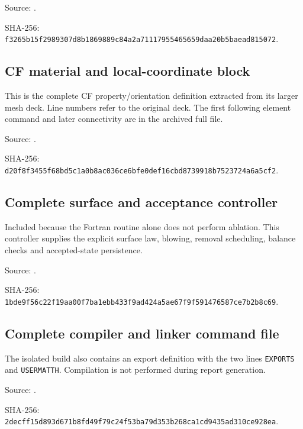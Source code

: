 \documentclass[oneside,openany]{amsdtx}
\begin{document}
{\footnotesize\noindent Source: .\par\noindent SHA-256: \texttt{f3265b15f2989307d8b1869889c84a2a71117955465659daa20b5baead815072}.\par}


\clearpage\subsection{CF material and local-coordinate block}
This is the complete CF property/orientation definition extracted from its larger mesh deck. Line numbers refer to the original deck. The first following element command and later connectivity are in the archived full file.

{\footnotesize\noindent Source: .\par\noindent SHA-256: \texttt{d20f8f3455f68bd5c1a0b8ac036ce6bfe0def16cbd8739918b7523724a6a5cf2}.\par}


\clearpage\subsection{Complete surface and acceptance controller}
Included because the Fortran routine alone does not perform ablation. This controller supplies the explicit surface law, blowing, removal scheduling, balance checks and accepted-state persistence.

{\footnotesize\noindent Source: .\par\noindent SHA-256: \texttt{1bde9f56c22f19aa00f7ba1ebb433f9ad424a5ae67f9f591476587ce7b2b8c69}.\par}


\clearpage\subsection{Complete compiler and linker command file}
The isolated build also contains an export definition with the two lines \texttt{EXPORTS} and \texttt{USERMATTH}. Compilation is not performed during report generation.

{\footnotesize\noindent Source: .\par\noindent SHA-256: \texttt{2decff15d893d671b8fd49f79c24f53ba79d353b268ca1cd9435ad310ce928ea}.\par}

\end{document}
